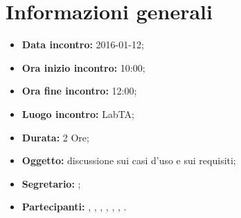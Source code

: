 \newpage
\section{Informazioni generali}
\begin{itemize}
\item \textbf{Data incontro:} 2016-01-12;
\item \textbf{Ora inizio incontro:} 10:00;
\item \textbf{Ora fine incontro:} 12:00;
\item \textbf{Luogo incontro:} LabTA;
\item \textbf{Durata:} 2 Ore;
\item \textbf{Oggetto:} discussione sui casi d'uso e sui requisiti;
\item \textbf{Segretario:} \SM;
\item \textbf{Partecipanti:} \AF, \FB, \GN, \GR, \MV, \MP, \SM.
\end{itemize}
